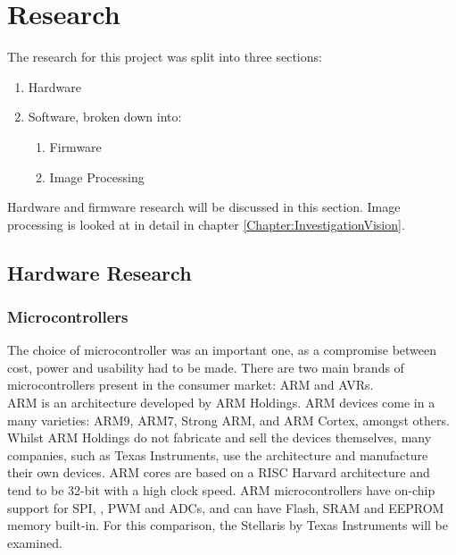 \chapter{Research} \label{Chapter:Research}
The research for this project was split into three sections:
\begin{enumerate}
\item Hardware
\item Software, broken down into:
\begin{enumerate}
\item Firmware
\item Image Processing
\end{enumerate}
\end{enumerate}

Hardware and firmware research will be discussed in this section. Image processing is looked at in detail in chapter \ref{Chapter:InvestigationVision}.
\section{Hardware Research}\label{Research:Hardware}
\subsection{Microcontrollers}\label{Research:Microcontrollers}
The choice of microcontroller was an important one, as a compromise between cost, power and usability had to be made. There are two main brands of microcontrollers present in the consumer market: ARM and AVRs.\\ %

ARM is an architecture developed by ARM Holdings. ARM devices come in a many varieties: ARM9, ARM7, Strong ARM, and ARM Cortex, amongst others. Whilst ARM Holdings do not fabricate and sell the devices themselves, many companies, such as Texas Instruments, use the architecture and manufacture their own devices. ARM cores are based on a RISC Harvard architecture and tend to be 32-bit with a high clock speed. ARM microcontrollers have on-chip support for SPI, \itc, PWM and ADCs, and can have Flash, SRAM and EEPROM memory built-in. For this comparison, the Stellaris by Texas Instruments will be examined. 

